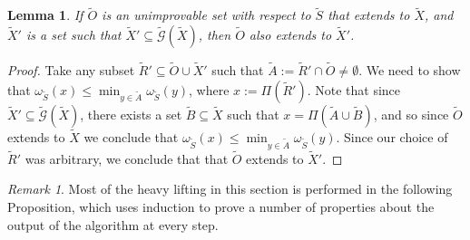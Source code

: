 \documentclass[12pt]{amsbook}
\theoremstyle{plain}
\newtheorem{lemma}{Lemma}
\theoremstyle{definition}
\theoremstyle{remark}
\newtheorem{remark}{Remark}
\newcommand{\set}{\tilde}
\newcommand{\genfun}{\tilde{\mathcal{G}}}
\newcommand{\om}{\omega}
\newcommand{\paren}[1]{\left(#1\right)}
\begin{document}
\begin{lemma}
\label{lemma:recombining extension elements preserves extension}
If $\set O$ is an unimprovable set with respect to $\set S$ that extends to $\set X$, and $\set X'$ is a set such that $\set X'\subseteq\genfun(\set X)$, then $\set O$ also extends to $\set X'$.
\end{lemma}

\begin{proof}
Take any subset $\set R' \subseteq \set O\cup\set X'$ such that $\set A := \set R'\cap \set O \ne \emptyset$.  We need to show that $\om_{\set S}(x)\le\min_{y\in\set A}\om_{\set S}(y)$, where $x := \Pi(\set R')$.  Note that since $\set X'\subseteq\genfun(\set X)$, there exists a set $\set B\subseteq \set X$ such that $x = \Pi\paren{\set A\cup\set B}$, and so since $\set O$ extends to $\set X$ we conclude that $\om_{\set S}(x)\le\min_{y\in\set A}\om_{\set S}(y)$.  Since our choice of $\set R'$ was arbitrary, we conclude that that $\set O$ extends to $\set X'$.
\end{proof}
\begin{remark}
Most of the heavy lifting in this section is performed in the following Proposition, which uses induction to prove a number of properties about the output of the algorithm at every step.
\end{remark}
\end{document}

